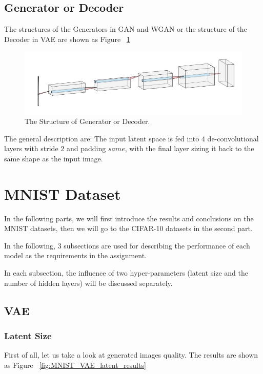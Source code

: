 \documentclass[12pt,letterpaper]{article}
\begin{document}
\subsection{Generator or Decoder}

The structures of the Generators in GAN and WGAN or the structure of the Decoder in VAE are shown as Figure ~\ref{fig:gen}
\begin{figure}[h]
    \centering
    \includegraphics[width=.6\linewidth]{generator.jpg}
    \caption{\small The Structure of Generator or Decoder.}
    \label{fig:gen}
\end{figure}

The general description are: The input latent space is fed into $4$ de-convolutional layers with stride $2$ and padding $same$, with the final layer sizing it back to the same shape as the input image.

\section{MNIST Dataset}

In the following parts, we will first introduce the results and conclusions on the MNIST datasets, then we will go to the CIFAR-10 datasets in the second part.

In the following, $3$ subsections are used for describing the performance of each model as the requirements in the assignment.

In each subsection, the influence of two hyper-parameters (latent size and the number of hidden layers) will be discussed separately.


\subsection{VAE}

\subsubsection{Latent Size}

First of all, let us take a look at generated images quality. The results are shown as Figure ~\ref{fig:MNIST_VAE_latent_results}
\end{document}
